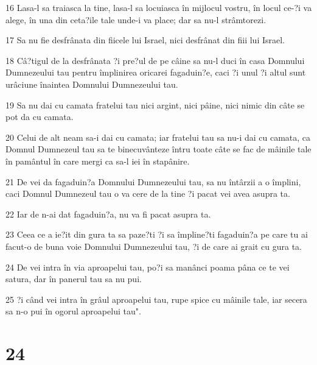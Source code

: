 \par 16 Lasa-l sa traiasca la tine, lasa-l sa locuiasca în mijlocul vostru, în locul ce-?i va alege, în una din ceta?ile tale unde-i va place; dar sa nu-l strâmtorezi.
\par 17 Sa nu fie desfrânata din fiicele lui Israel, nici desfrânat din fiii lui Israel.
\par 18 Câ?tigul de la desfrânata ?i pre?ul de pe câine sa nu-l duci în casa Domnului Dumnezeului tau pentru împlinirea oricarei fagaduin?e, caci ?i unul ?i altul sunt urâciune înaintea Domnului Dumnezeului tau.
\par 19 Sa nu dai cu camata fratelui tau nici argint, nici pâine, nici nimic din câte se pot da cu camata.
\par 20 Celui de alt neam sa-i dai cu camata; iar fratelui tau sa nu-i dai cu camata, ca Domnul Dumnezeul tau sa te binecuvânteze întru toate câte se fac de mâinile tale în pamântul în care mergi ca sa-l iei în stapânire.
\par 21 De vei da fagaduin?a Domnului Dumnezeului tau, sa nu întârzii a o împlini, caci Domnul Dumnezeul tau o va cere de la tine ?i pacat vei avea asupra ta.
\par 22 Iar de n-ai dat fagaduin?a, nu va fi pacat asupra ta.
\par 23 Ceea ce a ie?it din gura ta sa paze?ti ?i sa împline?ti fagaduin?a pe care tu ai facut-o de buna voie Domnului Dumnezeului tau, ?i de care ai grait cu gura ta.
\par 24 De vei intra în via aproapelui tau, po?i sa manânci poama pâna ce te vei satura, dar în panerul tau sa nu pui.
\par 25 ?i când vei intra în grâul aproapelui tau, rupe spice cu mâinile tale, iar secera sa n-o pui în ogorul aproapelui tau".

\chapter{24}

